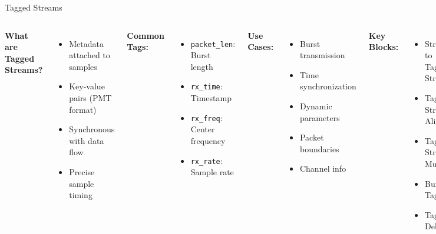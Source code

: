 \documentclass[aspectratio=169,11pt]{beamer}
\begin{document}
\begin{frame}{Tagged Streams}
\begin{columns}
\textbf{What are Tagged Streams?}
\begin{itemize}
    \item Metadata attached to samples
    \item Key-value pairs (PMT format)
    \item Synchronous with data flow
    \item Precise sample timing
\end{itemize}

\vspace{0.3cm}
\textbf{Common Tags:}
\begin{itemize}
    \item \texttt{packet\_len}: Burst length
    \item \texttt{rx\_time}: Timestamp
    \item \texttt{rx\_freq}: Center frequency
    \item \texttt{rx\_rate}: Sample rate
\end{itemize}

\textbf{Use Cases:}
\begin{itemize}
    \item Burst transmission
    \item Time synchronization
    \item Dynamic parameters
    \item Packet boundaries
    \item Channel info
\end{itemize}

\vspace{0.3cm}
\textbf{Key Blocks:}
\begin{itemize}
    \item Stream to Tagged Stream
    \item Tagged Stream Align
    \item Tagged Stream Mux
    \item Burst Tagger
    \item Tag Debug
\end{itemize}
\end{columns}
\end{frame}
\end{document}
